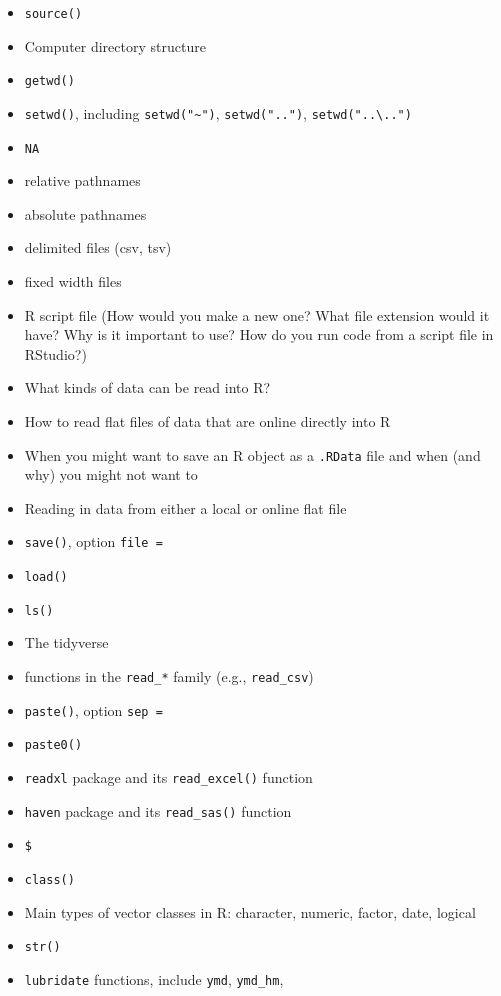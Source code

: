 \documentclass[]{book}
\providecommand{\tightlist}{%
  \setlength{\itemsep}{0pt}\setlength{\parskip}{0pt}}
\theoremstyle{definition}
\theoremstyle{definition}
\theoremstyle{definition}
\theoremstyle{remark}
\begin{document}
\begin{itemize}
\tightlist
\item
  \texttt{source()}
\item
  Computer directory structure
\item
  \texttt{getwd()}
\item
  \texttt{setwd()}, including \texttt{setwd("\textasciitilde{}")},
  \texttt{setwd("..")}, \texttt{setwd("..\textbackslash{}..")}
\item
  \texttt{NA}
\item
  relative pathnames
\item
  absolute pathnames
\item
  delimited files (csv, tsv)
\item
  fixed width files
\item
  R script file (How would you make a new one? What file extension would
  it have? Why is it important to use? How do you run code from a script
  file in RStudio?)
\item
  What kinds of data can be read into R?
\item
  How to read flat files of data that are online directly into R
\item
  When you might want to save an R object as a \texttt{.RData} file and
  when (and why) you might not want to
\item
  Reading in data from either a local or online flat file
\item
  \texttt{save()}, option \texttt{file\ =}
\item
  \texttt{load()}
\item
  \texttt{ls()}
\item
  The tidyverse
\item
  functions in the \texttt{read\_*} family (e.g., \texttt{read\_csv})
\item
  \texttt{paste()}, option \texttt{sep\ =}
\item
  \texttt{paste0()}
\item
  \texttt{readxl} package and its \texttt{read\_excel()} function
\item
  \texttt{haven} package and its \texttt{read\_sas()} function
\item
  \texttt{\$}
\item
  \texttt{class()}
\item
  Main types of vector classes in R: character, numeric, factor, date,
  logical
\item
  \texttt{str()}
\item
  \texttt{lubridate} functions, include \texttt{ymd}, \texttt{ymd\_hm},

\end{itemize}
\end{document}
